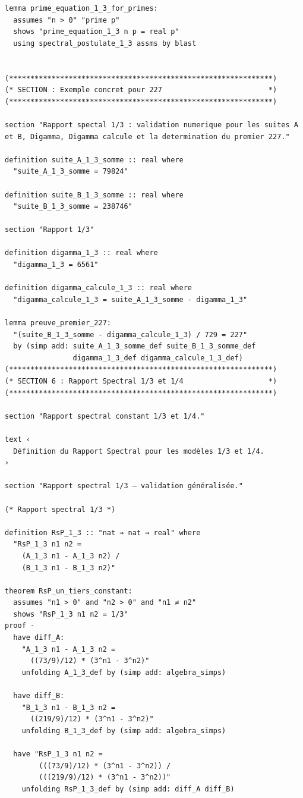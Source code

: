 \documentclass[a4paper,11pt]{article}
\begin{document}
\begin{holcode}[title={\textcolor{white}{File: methode\_spectral.thy -- Part 1/4}}]
\begin{lstlisting}
lemma prime_equation_1_3_for_primes:
  assumes "n > 0" "prime p"
  shows "prime_equation_1_3 n p = real p"
  using spectral_postulate_1_3 assms by blast


(**************************************************************)
(* SECTION : Exemple concret pour 227                         *)
(**************************************************************)

section "Rapport spectal 1/3 : validation numerique pour les suites A et B, Digamma, Digamma calcule et la determination du premier 227."

definition suite_A_1_3_somme :: real where
  "suite_A_1_3_somme = 79824"

definition suite_B_1_3_somme :: real where
  "suite_B_1_3_somme = 238746"

section "Rapport 1/3"

definition digamma_1_3 :: real where
  "digamma_1_3 = 6561"

definition digamma_calcule_1_3 :: real where
  "digamma_calcule_1_3 = suite_A_1_3_somme - digamma_1_3"

lemma preuve_premier_227:
  "(suite_B_1_3_somme - digamma_calcule_1_3) / 729 = 227"
  by (simp add: suite_A_1_3_somme_def suite_B_1_3_somme_def
                digamma_1_3_def digamma_calcule_1_3_def)
(**************************************************************)
(* SECTION 6 : Rapport Spectral 1/3 et 1/4                    *)
(**************************************************************)

section "Rapport spectral constant 1/3 et 1/4."

text ‹
  Définition du Rapport Spectral pour les modèles 1/3 et 1/4.
›

section "Rapport spectral 1/3 – validation généralisée."

(* Rapport spectral 1/3 *)

definition RsP_1_3 :: "nat ⇒ nat ⇒ real" where
  "RsP_1_3 n1 n2 =
    (A_1_3 n1 - A_1_3 n2) /
    (B_1_3 n1 - B_1_3 n2)"

theorem RsP_un_tiers_constant:
  assumes "n1 > 0" and "n2 > 0" and "n1 ≠ n2"
  shows "RsP_1_3 n1 n2 = 1/3"
proof -
  have diff_A:
    "A_1_3 n1 - A_1_3 n2 =
      ((73/9)/12) * (3^n1 - 3^n2)"
    unfolding A_1_3_def by (simp add: algebra_simps)

  have diff_B:
    "B_1_3 n1 - B_1_3 n2 =
      ((219/9)/12) * (3^n1 - 3^n2)"
    unfolding B_1_3_def by (simp add: algebra_simps)

  have "RsP_1_3 n1 n2 =
        (((73/9)/12) * (3^n1 - 3^n2)) /
        (((219/9)/12) * (3^n1 - 3^n2))"
    unfolding RsP_1_3_def by (simp add: diff_A diff_B)


\end{lstlisting}
\end{holcode}
\end{document}
